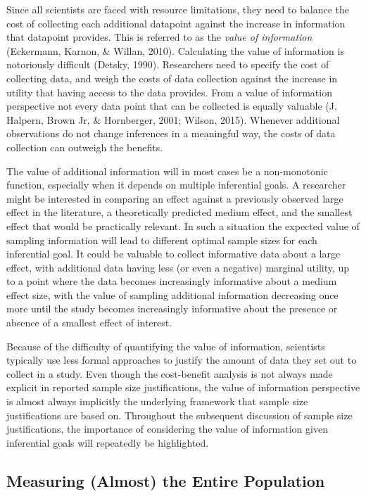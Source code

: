 \documentclass[
  english,
  ,jou,floatsintext]{apa6}
\begin{document}
Since all scientists are faced with resource limitations, they need to balance the cost of collecting each additional datapoint against the increase in information that datapoint provides. This is referred to as the \emph{value of information} (Eckermann, Karnon, \& Willan, 2010). Calculating the value of information is notoriously difficult (Detsky, 1990). Researchers need to specify the cost of collecting data, and weigh the costs of data collection against the increase in utility that having access to the data provides. From a value of information perspective not every data point that can be collected is equally valuable (J. Halpern, Brown Jr, \& Hornberger, 2001; Wilson, 2015). Whenever additional observations do not change inferences in a meaningful way, the costs of data collection can outweigh the benefits.

The value of additional information will in most cases be a non-monotonic function, especially when it depends on multiple inferential goals. A researcher might be interested in comparing an effect against a previously observed large effect in the literature, a theoretically predicted medium effect, and the smallest effect that would be practically relevant. In such a situation the expected value of sampling information will lead to different optimal sample sizes for each inferential goal. It could be valuable to collect informative data about a large effect, with additional data having less (or even a negative) marginal utility, up to a point where the data becomes increasingly informative about a medium effect size, with the value of sampling additional information decreasing once more until the study becomes increasingly informative about the presence or absence of a smallest effect of interest.

Because of the difficulty of quantifying the value of information, scientists typically use less formal approaches to justify the amount of data they set out to collect in a study. Even though the cost-benefit analysis is not always made explicit in reported sample size justifications, the value of information perspective is almost always implicitly the underlying framework that sample size justifications are based on. Throughout the subsequent discussion of sample size justifications, the importance of considering the value of information given inferential goals will repeatedly be highlighted.

\hypertarget{measuring-almost-the-entire-population}{%
\subsection{Measuring (Almost) the Entire Population}\label{measuring-almost-the-entire-population}}
\end{document}
